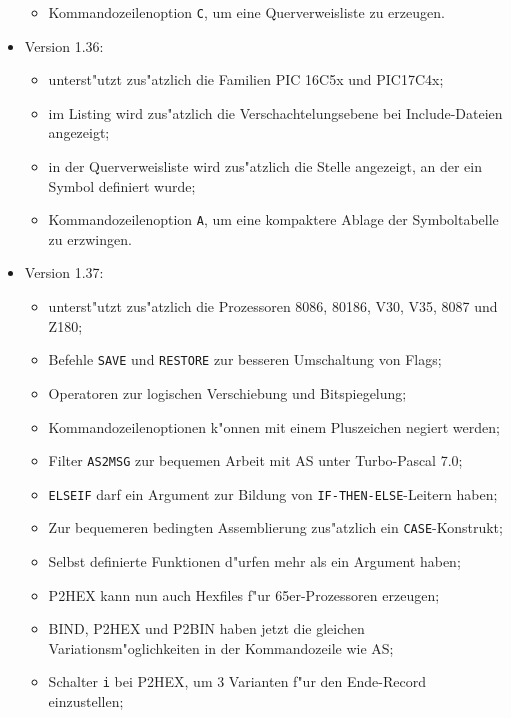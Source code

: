 \documentclass[12pt,a4paper,twoside]{report}
\newcommand{\tty}[1]{{\tt #1}}
\begin{document}
\begin{itemize}
{\begin{itemize}
{            belegte Speicherbereiche abgepr"uft;}
      \item{Kommandozeilenoption \tty{C}, um eine Querverweisliste zu erzeugen.}
      \end{itemize}}
\item{Version 1.36:
      \begin{itemize}
      \item{unterst"utzt zus"atzlich die Familien PIC 16C5x und
            PIC17C4x;}
      \item{im Listing wird zus"atzlich die Verschachtelungsebene bei
            Include-Dateien angezeigt;}
      \item{in der Querverweisliste wird zus"atzlich die Stelle angezeigt,
            an der ein Symbol definiert wurde;}
      \item{Kommandozeilenoption \tty{A}, um eine kompaktere Ablage der
            Symboltabelle zu erzwingen.}
      \end{itemize}}
\item{Version 1.37:
      \begin{itemize}
      \item{unterst"utzt zus"atzlich die Prozessoren 8086, 80186, V30,
            V35, 8087 und Z180;}
      \item{Befehle \tty{SAVE} und \tty{RESTORE} zur besseren Umschaltung
            von Flags;}
      \item{Operatoren zur logischen Verschiebung und Bitspiegelung;}
      \item{Kommandozeilenoptionen k"onnen mit einem Pluszeichen negiert
            werden;}
      \item{Filter \tty{AS2MSG} zur bequemen Arbeit mit AS unter Turbo-Pascal 7.0;}
      \item{\tty{ELSEIF} darf ein Argument zur Bildung von
            \tty{IF-THEN-ELSE}-Leitern haben;}
      \item{Zur bequemeren bedingten Assemblierung zus"atzlich ein
            \tty{CASE}-Konstrukt;}
      \item{Selbst definierte Funktionen d"urfen mehr als ein Argument haben;}
      \item{P2HEX kann nun auch Hexfiles f"ur 65er-Prozessoren erzeugen;}
      \item{BIND, P2HEX und P2BIN haben jetzt die gleichen
            Variationsm"oglichkeiten in der Kommandozeile wie AS;}
      \item{Schalter \tty{i} bei P2HEX, um 3 Varianten f"ur den Ende-Record
            einzustellen;}

\end{itemize}}
\end{itemize}
\end{document}
